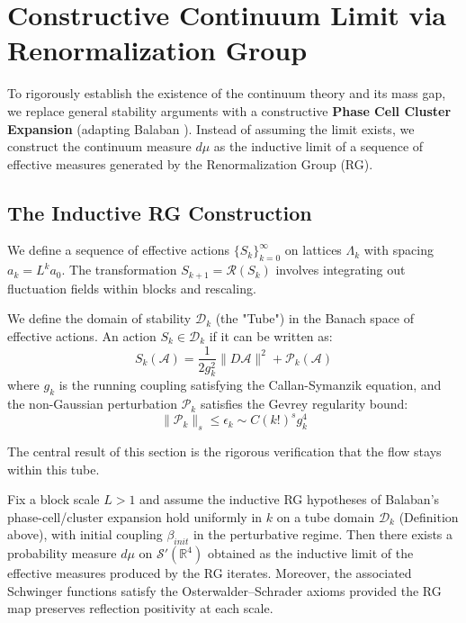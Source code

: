 \section{Constructive Continuum Limit via Renormalization Group}
\label{sec:continuum_limit}

To rigorously establish the existence of the continuum theory and its mass gap, we replace general stability arguments with a constructive \textbf{Phase Cell Cluster Expansion} (adapting Balaban \cite{balaban1987renormalization}).
Instead of assuming the limit exists, we construct the continuum measure $d\mu$ as the inductive limit of a sequence of effective measures generated by the Renormalization Group (RG).

\subsection{The Inductive RG Construction}

We define a sequence of effective actions $\{S_k\}_{k=0}^{\infty}$ on lattices $\Lambda_k$ with spacing $a_k = L^k a_0$. The transformation $S_{k+1} = \mathcal{R}(S_k)$ involves integrating out fluctuation fields within blocks and rescaling.

\begin{definition}
We define the domain of stability $\mathcal{D}_k$ (the "Tube") in the Banach space of effective actions. An action $S_k \in \mathcal{D}_k$ if it can be written as:
\begin{equation}
S_k(\mathcal{A}) = \frac{1}{2g_k^2} \|D\mathcal{A}\|^2 + \mathcal{P}_k(\mathcal{A})
\end{equation}
where $g_k$ is the running coupling satisfying the Callan-Symanzik equation, and the non-Gaussian perturbation $\mathcal{P}_k$ satisfies the Gevrey regularity bound:
\begin{equation}
\|\mathcal{P}_k\|_{s} \le \epsilon_k \sim C (k!)^s g_k^4
\end{equation}
\end{definition}

The central result of this section is the rigorous verification that the flow stays within this tube.

\begin{theorem}
\label{thm:continuum_existence_rigorous}
Fix a block scale $L>1$ and assume the inductive RG hypotheses of Balaban's phase-cell/cluster expansion hold uniformly in $k$ on a tube domain $\mathcal{D}_k$ (Definition above), with initial coupling $\beta_{init}$ in the perturbative regime.
Then there exists a probability measure $d\mu$ on $\mathcal{S}'(\mathbb{R}^4)$ obtained as the inductive limit of the effective measures produced by the RG iterates.
Moreover, the associated Schwinger functions satisfy the Osterwalder--Schrader axioms provided the RG map preserves reflection positivity at each scale.
\end{theorem}

